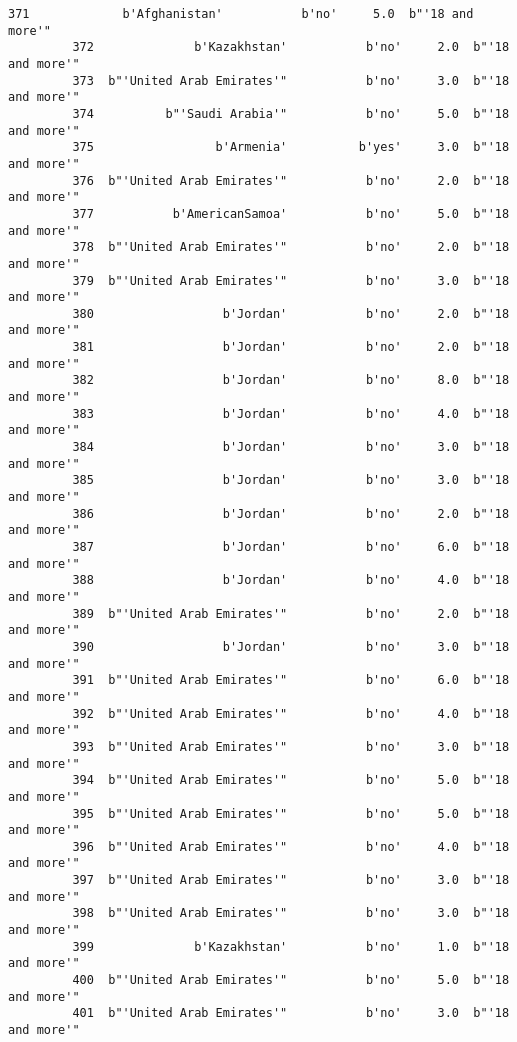 \documentclass[11pt]{article}
\begin{document}
\begin{Verbatim}[commandchars=\\\{\}]
         371             b'Afghanistan'           b'no'     5.0  b"'18 and more'"   
         372              b'Kazakhstan'           b'no'     2.0  b"'18 and more'"   
         373  b"'United Arab Emirates'"           b'no'     3.0  b"'18 and more'"   
         374          b"'Saudi Arabia'"           b'no'     5.0  b"'18 and more'"   
         375                 b'Armenia'          b'yes'     3.0  b"'18 and more'"   
         376  b"'United Arab Emirates'"           b'no'     2.0  b"'18 and more'"   
         377           b'AmericanSamoa'           b'no'     5.0  b"'18 and more'"   
         378  b"'United Arab Emirates'"           b'no'     2.0  b"'18 and more'"   
         379  b"'United Arab Emirates'"           b'no'     3.0  b"'18 and more'"   
         380                  b'Jordan'           b'no'     2.0  b"'18 and more'"   
         381                  b'Jordan'           b'no'     2.0  b"'18 and more'"   
         382                  b'Jordan'           b'no'     8.0  b"'18 and more'"   
         383                  b'Jordan'           b'no'     4.0  b"'18 and more'"   
         384                  b'Jordan'           b'no'     3.0  b"'18 and more'"   
         385                  b'Jordan'           b'no'     3.0  b"'18 and more'"   
         386                  b'Jordan'           b'no'     2.0  b"'18 and more'"   
         387                  b'Jordan'           b'no'     6.0  b"'18 and more'"   
         388                  b'Jordan'           b'no'     4.0  b"'18 and more'"   
         389  b"'United Arab Emirates'"           b'no'     2.0  b"'18 and more'"   
         390                  b'Jordan'           b'no'     3.0  b"'18 and more'"   
         391  b"'United Arab Emirates'"           b'no'     6.0  b"'18 and more'"   
         392  b"'United Arab Emirates'"           b'no'     4.0  b"'18 and more'"   
         393  b"'United Arab Emirates'"           b'no'     3.0  b"'18 and more'"   
         394  b"'United Arab Emirates'"           b'no'     5.0  b"'18 and more'"   
         395  b"'United Arab Emirates'"           b'no'     5.0  b"'18 and more'"   
         396  b"'United Arab Emirates'"           b'no'     4.0  b"'18 and more'"   
         397  b"'United Arab Emirates'"           b'no'     3.0  b"'18 and more'"   
         398  b"'United Arab Emirates'"           b'no'     3.0  b"'18 and more'"   
         399              b'Kazakhstan'           b'no'     1.0  b"'18 and more'"   
         400  b"'United Arab Emirates'"           b'no'     5.0  b"'18 and more'"   
         401  b"'United Arab Emirates'"           b'no'     3.0  b"'18 and more'"   

\end{Verbatim}
\end{document}
